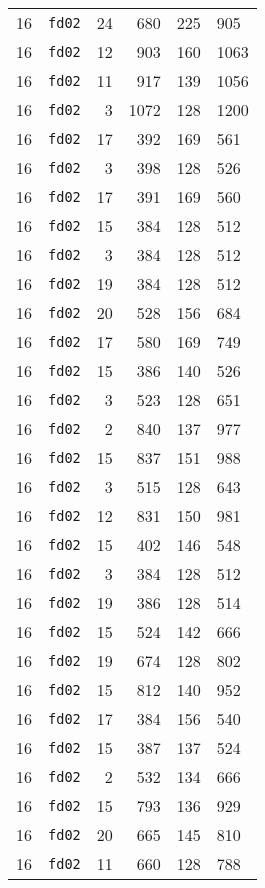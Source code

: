 \documentclass{article}
\begin{document}
\begin{table}[h!]
\begin{tabular}{llrrrl}
    16 & \texttt{fd02} & 24 & 680 & 225 & 905 \\
    16 & \texttt{fd02} & 12 & 903 & 160 & 1063 \\
    16 & \texttt{fd02} & 11 & 917 & 139 & 1056 \\
    16 & \texttt{fd02} & 3 & 1072 & 128 & 1200 \\
    16 & \texttt{fd02} & 17 & 392 & 169 & 561 \\
    16 & \texttt{fd02} & 3 & 398 & 128 & 526 \\
    16 & \texttt{fd02} & 17 & 391 & 169 & 560 \\
    16 & \texttt{fd02} & 15 & 384 & 128 & 512 \\
    16 & \texttt{fd02} & 3 & 384 & 128 & 512 \\
    16 & \texttt{fd02} & 19 & 384 & 128 & 512 \\
    16 & \texttt{fd02} & 20 & 528 & 156 & 684 \\
    16 & \texttt{fd02} & 17 & 580 & 169 & 749 \\
    16 & \texttt{fd02} & 15 & 386 & 140 & 526 \\
    16 & \texttt{fd02} & 3 & 523 & 128 & 651 \\
    16 & \texttt{fd02} & 2 & 840 & 137 & 977 \\
    16 & \texttt{fd02} & 15 & 837 & 151 & 988 \\
    16 & \texttt{fd02} & 3 & 515 & 128 & 643 \\
    16 & \texttt{fd02} & 12 & 831 & 150 & 981 \\
    16 & \texttt{fd02} & 15 & 402 & 146 & 548 \\
    16 & \texttt{fd02} & 3 & 384 & 128 & 512 \\
    16 & \texttt{fd02} & 19 & 386 & 128 & 514 \\
    16 & \texttt{fd02} & 15 & 524 & 142 & 666 \\
    16 & \texttt{fd02} & 19 & 674 & 128 & 802 \\
    16 & \texttt{fd02} & 15 & 812 & 140 & 952 \\
    16 & \texttt{fd02} & 17 & 384 & 156 & 540 \\
    16 & \texttt{fd02} & 15 & 387 & 137 & 524 \\
    16 & \texttt{fd02} & 2 & 532 & 134 & 666 \\
    16 & \texttt{fd02} & 15 & 793 & 136 & 929 \\
    16 & \texttt{fd02} & 20 & 665 & 145 & 810 \\
    16 & \texttt{fd02} & 11 & 660 & 128 & 788 \\

\end{tabular}
\end{table}
\end{document}
